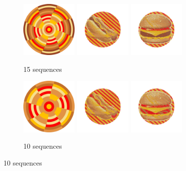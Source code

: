 \documentclass{article}
\begin{document}
\begin{figure}[ht!]
\begin{subfigure}[t]{0.4\textwidth}
\includegraphics[width=0.3\textwidth]{images/reduction/15/disc.png}
\includegraphics[width=0.3\textwidth]{images/reduction/15/sim0.png}
\includegraphics[width=0.3\textwidth]{images/reduction/15/sim1.png}
\caption{15 sequences}
\end{subfigure}
\hfill
\begin{subfigure}[t]{0.4\textwidth}
\includegraphics[width=0.3\textwidth]{images/reduction/10/disc.png}
\includegraphics[width=0.3\textwidth]{images/reduction/10/sim0.png}
\includegraphics[width=0.3\textwidth]{images/reduction/10/sim1.png}
\caption{10 sequences}
\end{subfigure}


\end{figure}
\end{document}
